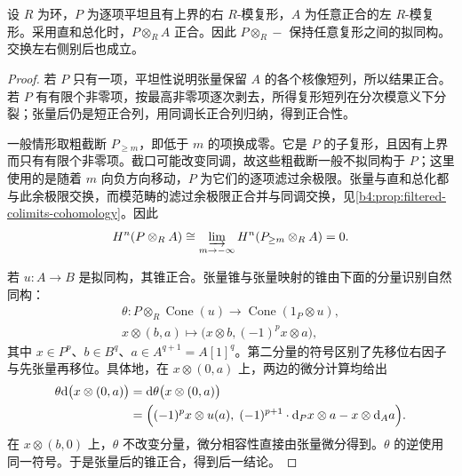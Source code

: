 \begin{lemma}\label{b4:lem:bounded-flat-tensor-preserves}
	设 \(R\) 为环，\(P\) 为逐项平坦且有上界的右 \(R\)-模复形，\(A\) 为任意正合的左 \(R\)-模复形。采用直和总化时，\(P\otimes_RA\) 正合。因此 \(P\otimes_R-\) 保持任意复形之间的拟同构。交换左右侧别后也成立。
\end{lemma}
\begin{proof}
	若 \(P\) 只有一项，平坦性说明张量保留 \(A\) 的各个核像短列，所以结果正合。若 \(P\) 有有限个非零项，按最高非零项逐次剥去，所得复形短列在分次模意义下分裂；张量后仍是短正合列，用同调长正合列归纳，得到正合性。

	一般情形取粗截断 \(P_{\ge m}\)，即低于 \(m\) 的项换成零。它是 \(P\) 的子复形，且因有上界而只有有限个非零项。截口可能改变同调，故这些粗截断一般不拟同构于 \(P\)；这里使用的是随着 \(m\) 向负方向移动，\(P\) 为它们的逐项滤过余极限。张量与直和总化都与此余极限交换，而模范畴的滤过余极限正合并与同调交换，见\cref{b4:prop:filtered-colimits-cohomology}。因此
	\[
		H^n(P\otimes_RA) \cong\varinjlim_{m\to-\infty}H^n(P_{\ge m}\otimes_RA)=0.
	\]

	若 \(u:A\to B\) 是拟同构，其锥正合。张量锥与张量映射的锥由下面的分量识别自然同构：
	\[
		\begin{gathered}
			\theta:P\otimes_R\operatorname{Cone}(u) \longrightarrow\operatorname{Cone}(1_P\otimes u),\\
			x\otimes(b,a)\longmapsto \bigl(x\otimes b,(-1)^p x\otimes a\bigr),
		\end{gathered}
	\]
	其中 \(x\in P^p\)、\(b\in B^q\)、\(a\in A^{q+1}=A[1]^q\)。第二分量的符号区别了先移位右因子与先张量再移位。具体地，在 \(x\otimes(0,a)\) 上，两边的微分计算均给出
	\[
		\begin{aligned}
			\theta\mathrm{d}\bigl(x\otimes(0,a)\bigr) &=\mathrm{d}\theta\bigl(x\otimes(0,a)\bigr)\\
			&=\Bigl((-1)^p x\otimes u(a),\; (-1)^{p+1}\cdot\mathrm{d}_Px\otimes a-x\otimes\mathrm{d}_Aa\Bigr).
		\end{aligned}
	\]
	在 \(x\otimes(b,0)\) 上，\(\theta\) 不改变分量，微分相容性直接由张量微分得到。\(\theta\) 的逆使用同一符号。于是张量后的锥正合，得到后一结论。
\end{proof}

